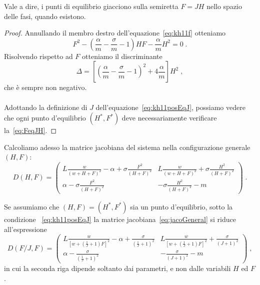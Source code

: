 Vale a dire, i punti di equilibrio giacciono sulla semiretta $F= JH$ nello spazio delle fasi, quando esistono.

\begin{proof}
    Annullando il membro destro dell'equazione~\eqref{eq:kh11f} otteniamo
    $$F^2 - \left( \frac{\alpha}{m} - \frac{\sigma}{m} -1
        \right) H F - \frac{\alpha}{m} H^2 = 0 \; .$$
    Risolvendo rispetto ad $F$ otteniamo il discriminante
    $$\Delta = \left[ {\left( \frac{\alpha}{m} - \frac{\sigma}{m} -1
        \right)}^2 + 4 \frac{\alpha}{m}
        \right] H^2 \; , $$
    che è sempre non negativo.

    \paragraph{}
    Adottando la definizione di $J$ dell'equazione~\eqref{eq:kh11posEqJ}, possiamo vedere
    che ogni punto d'equilibrio $(H^*, F^*)$ deve necessariamente verificare la~\eqref{eq:FeqJH}.
\end{proof}


Calcoliamo adesso la matrice jacobiana del sistema nella configurazione generale $(H, F)$:
\begin{equation}
    D(H, F) =
    \begin{pmatrix}
        L \frac{w}{{(w + H + F)}^2} - \alpha + \sigma \frac{F^2}{{(H+F)}^2} &
        L \frac{w}{{(w + H + F)}^2} + \sigma \frac{H^2}{{(H+F)}^2}
        \\
        \alpha - \sigma \frac{F^2}{{(H+F)}^2} &
        - \sigma \frac{H^2}{{(H+F)}^2} - m
    \end{pmatrix} \; .
    \label{eq:jacoGeneral}
\end{equation}

Se assumiamo che $(H, F) = (H^*, F^*)$ sia un punto d'equilibrio, sotto la condizione ~\eqref{eq:kh11posEqJ}
la matrice jacobiana~\eqref{eq:jacoGeneral} si riduce all'espressione
\begin{equation}
    D \left( F/J, F \right) =
    \begin{pmatrix}
        L \frac{w}{ {\left[ w + \left( \frac{1}{J} +1 \right) F \right]}^2 } - \alpha
        + \frac{ \sigma }{ {\left( \frac{1}{J} + 1 \right)}^2 } &
        L \frac{w}{ {\left[ w + \left( \frac{1}{J} +1 \right) F \right]}^2 }
        + \frac{ \sigma }{ {\left( J + 1 \right)}^2 } \\
        \alpha - \frac{ \sigma }{ {\left( \frac{1}{J} + 1 \right)}^2 } &
        - \frac{ \sigma }{ {\left( J + 1 \right)}^2 } - m
    \end{pmatrix} \; ,
    \label{eq:jacoOnJFH}
\end{equation}
in cui la seconda riga dipende soltanto dai parametri, e non dalle variabili $H$ ed $F$.

